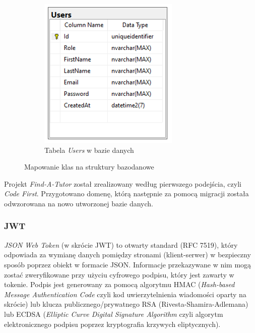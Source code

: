 \documentclass[12pt]{article}
\numberwithin{figure}{section}
\begin{document}
\begin{sloppypar}
\begin{figure}[H]
\begin{subfigure}{.4\textwidth}
      \includegraphics[width=1\linewidth]{images/chapter_3/ef-db.png}
      \caption{Tabela \textit{Users} w bazie danych}
      \label{fig:ef-db}
    \end{subfigure}
    \caption{Mapowanie klas na struktury bazodanowe}
    \label{fig:ef}
\end{figure}
    
Projekt \textit{Find-A-Tutor} został zrealizowany według pierwszego podejścia, czyli \textit{Code First}. Przygotowano domenę, którą następnie za pomocą migracji została odwzorowana na nowo utworzonej bazie danych. 

\subsubsection{JWT}
\textit{JSON Web Token} (w skrócie JWT) to otwarty standard (RFC 7519), który odpowiada za wymianę danych pomiędzy stronami (klient-serwer) w bezpieczny sposób poprzez obiekt w formacie JSON. Informacje przekazywane w nim mogą zostać zweryfikowane przy użyciu cyfrowego podpisu, który jest zawarty w tokenie. Podpis jest generowany za pomocą algorytmu HMAC (\textit{Hash-based Message Authentication Code} czyli kod uwierzytelnienia wiadomości oparty na skrócie) lub klucza publicznego/prywatnego RSA (Rivesta-Shamira-Adlemana) lub ECDSA (\textit{Elliptic Curve Digital Signature Algorithm} czyli algorytm elektronicznego podpisu poprzez kryptografia krzywych eliptycznych).
    

\end{sloppypar}
\end{document}
